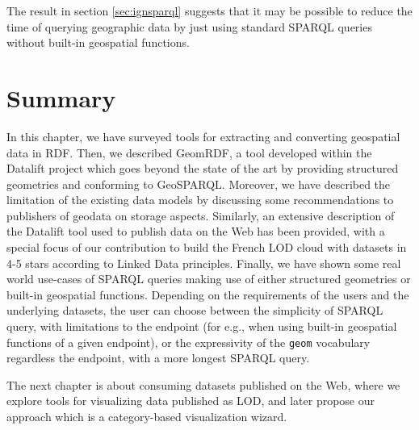 The result in section \ref{sec:ignsparql} suggests that it may be possible to reduce the time of querying geographic data by just using standard SPARQL queries without  built-in geospatial functions.

\section{Summary}
\label{sec:ch2-summary}
In this chapter, we have surveyed tools for extracting and converting geospatial data in RDF. Then, we described GeomRDF, a tool developed within the Datalift project which goes beyond the state of the art by providing structured geometries and conforming to GeoSPARQL. Moreover, we have described the limitation of the existing data models by discussing some recommendations to publishers of geodata on storage aspects. Similarly, an extensive description of the Datalift tool used to publish data on the Web has been provided, with a special focus of our contribution to build the French LOD cloud with datasets in 4-5 stars according to Linked Data principles. Finally, we have shown some real world use-cases of SPARQL queries making use of either structured geometries or built-in geospatial functions. Depending on the requirements of the users and the underlying datasets, the user can choose between the simplicity of SPARQL query, with limitations to the endpoint (for e.g., when using built-in geospatial functions of a given endpoint), or the expressivity of the \texttt{geom} vocabulary regardless the endpoint, with a more longest SPARQL query.


The next chapter is about consuming datasets published on the Web, where we explore tools for visualizing data published as LOD, and later propose our approach which is a category-based visualization wizard.
